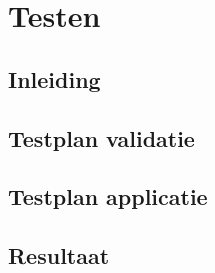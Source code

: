 \chapter{Testen}
\section{Inleiding}

\section{Testplan validatie}
\section{Testplan applicatie}

\section{Resultaat}
